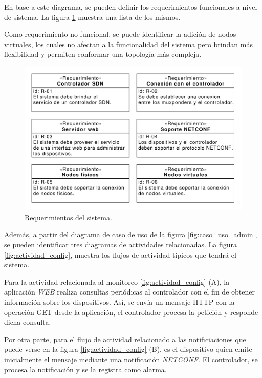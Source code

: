   En base a este diagrama, se pueden definir los requerimientos funcionales a nivel de sistema. La figura \ref{fig:req_sys} muestra una lista de los mismos. 
  
  Como requerimiento no funcional, se puede identificar la adición de nodos virtuales, los cuales no afectan a la funcionalidad del sistema pero brindan más flexibilidad y permiten conformar una topología más compleja.

  \begin{figure}[H]
    \centering
    \includegraphics[scale=0.65]{Figures/req_sys.pdf}
    \caption{Requerimientos del sistema.}
    \label{fig:req_sys}
  \end{figure}


  Además, a partir del diagrama de caso de uso de la figura \ref{fig:caso_uso_admin}, se pueden identificar tres diagramas de actividades relacionadas. La figura \ref{fig:actividad_config}, muestra los flujos de actividad típicos que tendrá el sistema. 
  
  Para la actividad relacionada al monitoreo \ref{fig:actividad_config} (A), la aplicación \textit{WEB} realiza consultas periódicas al controlador con el fin de obtener información sobre los dispositivos. Así, se envía un mensaje HTTP con la operación GET desde la aplicación, el controlador procesa la petición y responde dicha consulta.

Por otra parte, para el flujo de actividad relacionado a las notificiaciones que puede verse en la figura \ref{fig:actividad_config} (B), es el dispositivo quien emite inicialmente el mensaje mediante una notificación \textit{NETCONF}. El controlador, se procesa la notificación y se la registra como alarma.

